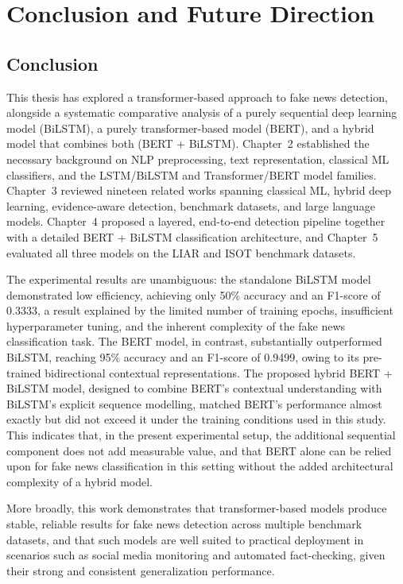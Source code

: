\sloppy
\chapter{Conclusion and Future Direction}

\section{Conclusion}

This thesis has explored a transformer-based approach to fake news detection, alongside a systematic comparative analysis of a purely sequential deep learning model (BiLSTM), a purely transformer-based model (BERT), and a hybrid model that combines both (BERT + BiLSTM). Chapter~2 established the necessary background on NLP preprocessing, text representation, classical ML classifiers, and the LSTM/BiLSTM and Transformer/BERT model families. Chapter~3 reviewed nineteen related works spanning classical ML, hybrid deep learning, evidence-aware detection, benchmark datasets, and large language models. Chapter~4 proposed a layered, end-to-end detection pipeline together with a detailed BERT + BiLSTM classification architecture, and Chapter~5 evaluated all three models on the LIAR and ISOT benchmark datasets.

The experimental results are unambiguous: the standalone BiLSTM model demonstrated low efficiency, achieving only 50\% accuracy and an F1-score of 0.3333, a result explained by the limited number of training epochs, insufficient hyperparameter tuning, and the inherent complexity of the fake news classification task. The BERT model, in contrast, substantially outperformed BiLSTM, reaching 95\% accuracy and an F1-score of 0.9499, owing to its pre-trained bidirectional contextual representations. The proposed hybrid BERT + BiLSTM model, designed to combine BERT's contextual understanding with BiLSTM's explicit sequence modelling, matched BERT's performance almost exactly but did not exceed it under the training conditions used in this study. This indicates that, in the present experimental setup, the additional sequential component does not add measurable value, and that BERT alone can be relied upon for fake news classification in this setting without the added architectural complexity of a hybrid model.

More broadly, this work demonstrates that transformer-based models produce stable, reliable results for fake news detection across multiple benchmark datasets, and that such models are well suited to practical deployment in scenarios such as social media monitoring and automated fact-checking, given their strong and consistent generalization performance.

